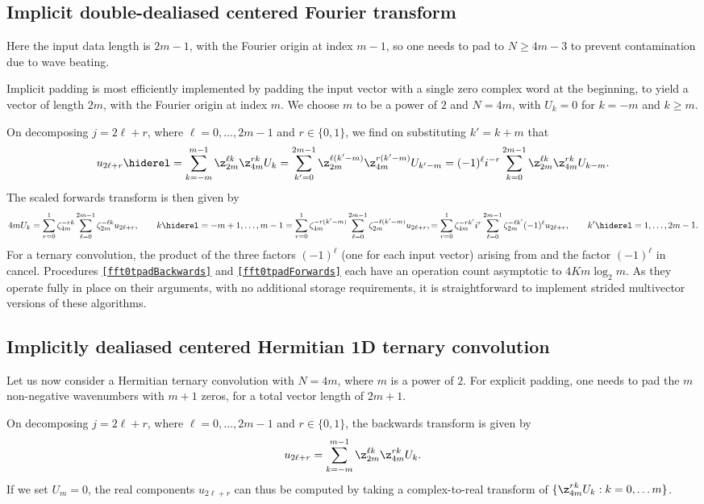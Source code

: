 \documentclass[final]{siamltex}
\def\ee{\end{dmath*}}
\def\bel{\begin{dmath}}
\def\eel{\end{dmath}}
\def\bec{\begin{dmath*}[compact]}
\let\eec\ee
\def\no{\hiderel}
\begin{document}
\subsection{Implicit double-dealiased centered Fourier transform}
\label{fft0bi}
Here the input data length is $2m-1$, with the Fourier origin at index
$m-1$, so one needs to pad to $N\ge 4m-3$ to prevent contamination due to
wave beating.

Implicit padding is most efficiently implemented by padding the input
vector with a single zero complex word at the beginning, to yield a vector
of length $2m$, with the Fourier origin at index $m$. We choose $m$ to be
a power of $2$ and $N=4m$, with $U_k=0$ for $k=-m$ and $k\ge m$. 

On decomposing $j=2\ell+r$, where $\ell=0,\ldots, 2m-1$ and $r\in\{0,1\}$,
we find on substituting $k'=k+m$ that
\bel
u_{2\ell +r}\no=\sum_{k=-m}^{m-1}\z_{2m}^{\ell k} \z_{4m}^{rk} U_k
=\sum_{k'=0}^{2m-1}\z_{2m}^{\ell (k'-m)} \z_{4m}^{r(k'-m)} U_{k'-m}
=(-1)^\ell i^{-r}\sum_{k=0}^{2m-1}\z_{2m}^{\ell k} \z_{4m}^{rk} U_{k-m}.
\label{fft0tbackwards}
\eel
The scaled forwards transform is then given by
\bel
{4m}U_k=\sum_{r=0}^{1}\zeta_{4m}^{-rk}\sum_{\ell=0}^{2m-1}\zeta_{2m}^{-\ell k} u_{2\ell+r},
\qquad k\no =-m+1,\ldots,m-1
=\sum_{r=0}^{1}\zeta_{4m}^{-r(k'-m)}\sum_{\ell=0}^{2m-1}\zeta_{2m}^{-\ell (k'-m)} u_{2\ell+r},
=\sum_{r=0}^{1}\zeta_{4m}^{-rk'}i^r\sum_{\ell=0}^{2m-1}\zeta_{2m}^{-\ell k'}(-1)^\ell u_{2\ell+r},
\qquad k'\no =1,\ldots,2m-1.\label{fft0tforwards}
\eel
For a ternary convolution, the product of the three factors $(-1)^\ell$
(one for each input vector) arising from 
and the factor $(-1)^\ell$ in  cancel.
Procedures {\tt\ref{fft0tpadBackwards}} and {\tt\ref{fft0tpadForwards}}
each have an operation count asymptotic to $4Km\log_2 m$. As they
operate fully in place on their arguments, with no additional storage
requirements, it is straightforward to implement strided multivector
versions of these algorithms.

\subsection{Implicitly dealiased centered Hermitian 1D ternary convolution}
Let us now consider a Hermitian ternary convolution with $N=4m$, where $m$ is a
power of $2$. For explicit padding, one needs to pad the $m$ non-negative
wavenumbers with $m+1$ zeros, for a total vector length of $2m+1$.

On decomposing $j=2\ell+r$, where
$\ell=0,\ldots, 2m-1$ and $r\in\{0,1\}$, the backwards transform is given
by
\bec
u_{2\ell +r}=\sum_{k=-m}^{m-1} \z_{2m}^{\ell k} \z_{4m}^{rk} U_k.
\eec
If we set $U_m=0$, the real components $u_{2\ell +r}$ can thus be computed
by taking a complex-to-real transform of
$\{\z_{4m}^{rk} U_k : k=0,\ldots m\}$.
\end{document}
